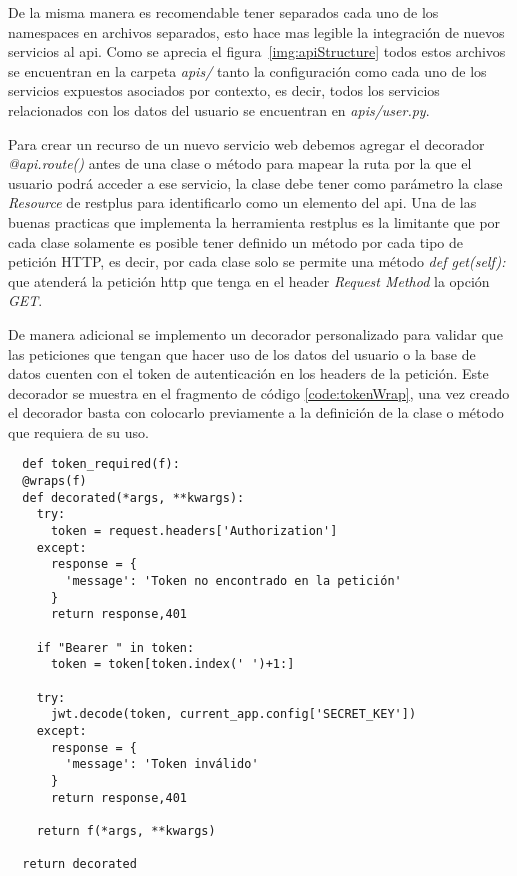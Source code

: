 De la misma manera es recomendable tener separados cada uno de los namespaces en archivos separados, esto hace mas legible la integración de nuevos servicios al api. Como se aprecia el figura~\ref{img:apiStructure} todos estos archivos se encuentran en la carpeta \textit{apis/} tanto la configuración como cada uno de los servicios expuestos asociados por contexto, es decir, todos los servicios relacionados con los datos del usuario se encuentran en \textit{apis/user.py}.

Para crear un recurso de un nuevo servicio web debemos agregar el decorador \textit{@api.route()} antes de una clase o método para mapear la ruta por la que el usuario podrá acceder a ese servicio, la clase debe tener como parámetro la clase \textit{Resource} de restplus para identificarlo como un elemento del api. Una de las buenas practicas que implementa la herramienta restplus es la limitante que por cada clase solamente es posible tener definido un método por cada tipo de petición HTTP, es decir, por cada clase solo se permite una método \textit{def get(self):} que atenderá la petición http que tenga en el header \textit{Request Method} la opción \textit{GET}.

De manera adicional se implemento un decorador personalizado para validar que las peticiones que tengan que hacer uso de los datos del usuario o la base de datos cuenten con el token de autenticación en los headers de la petición. Este decorador se muestra en el fragmento de código \ref{code:tokenWrap}, una vez creado el decorador basta con colocarlo previamente a la definición de la clase o método que requiera de su uso.

\begin{code}
\label{code:tokenWrap}
\begin{verbatim}
  def token_required(f):
  @wraps(f)
  def decorated(*args, **kwargs):
    try:
      token = request.headers['Authorization']
    except:
      response = {
        'message': 'Token no encontrado en la petición'
      }
      return response,401

    if "Bearer " in token:
      token = token[token.index(' ')+1:]

    try:
      jwt.decode(token, current_app.config['SECRET_KEY'])
    except:
      response = {
        'message': 'Token inválido'
      }
      return response,401

    return f(*args, **kwargs)

  return decorated
\end{verbatim}
\end{code}